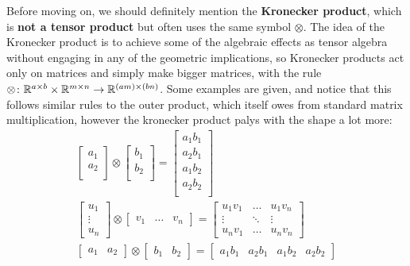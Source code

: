 \documentclass[11pt]{article}
\begin{document}
Before moving on, we should definitely mention the \textbf{Kronecker product}, which is \textbf{not a tensor product} but often uses the same symbol $\otimes$. The idea of the Kronecker product is to achieve some of the algebraic effects as tensor algebra without engaging in any of the geometric implications, so Kronecker products act only on matrices and simply make bigger matrices, with the rule $\otimes \colon \mathbb{R}^{a \times b} \times \mathbb{R}^{m \times n} \to \mathbb{R}^{(am) \times (bn)}$. Some examples are given, and notice that this follows similar rules to the outer product, which itself owes from standard matrix multiplication, however the kronecker product palys with the shape a lot more: \begin{gather*}
\begin{bmatrix}
	a_1\\
	a_2\\
\end{bmatrix}
\otimes
\begin{bmatrix}
	b_1\\
	b_2\\
\end{bmatrix} =
\begin{bmatrix}
	a_1b_1\\
	a_2b_1\\
	a_1b_2\\
	a_2b_2\\
\end{bmatrix} \\
\begin{bmatrix} u_1 \\ \vdots \\ u_n \end{bmatrix} \otimes \begin{bmatrix} v_1 & \dots & v_n \end{bmatrix} = \begin{bmatrix} u_1 v_1 & \dots & u_1 v_n \\ \vdots & \ddots & \vdots \\ u_n v_1 & \dots & u_n v_n \end{bmatrix} \\
\begin{bmatrix}
	a_1&
	a_2
\end{bmatrix}
\otimes
\begin{bmatrix}
	b_1&
	b_2
\end{bmatrix} =
\begin{bmatrix}
	a_1b_1&
	a_2b_1&
	a_1b_2&
	a_2b_2
\end{bmatrix}
\end{gather*}
\end{document}
